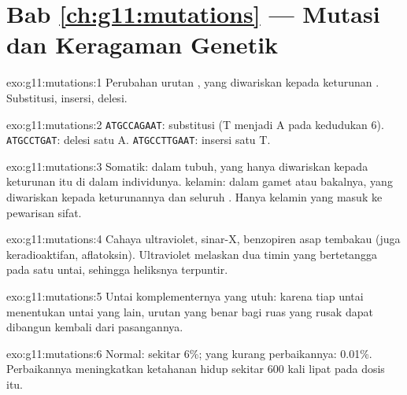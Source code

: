\section*{Bab \ref{ch:g11:mutations} --- Mutasi dan Keragaman Genetik}

\begin{solution}{exo:g11:mutations:1}
Perubahan urutan  , yang diwariskan kepada keturunan
. Substitusi, insersi, delesi.
\end{solution}

\begin{solution}{exo:g11:mutations:2}
\texttt{ATGCCAGAAT}: substitusi (T menjadi A pada kedudukan 6).
\texttt{ATGCCTGAT}: delesi satu A. \texttt{ATGCCTTGAAT}: insersi
satu T.
\end{solution}

\begin{solution}{exo:g11:mutations:3}
Somatik: dalam  tubuh, yang hanya diwariskan kepada keturunan 
itu di dalam individunya.  kelamin: dalam gamet atau bakalnya, yang
diwariskan kepada keturunannya dan seluruh . Hanya  
kelamin yang masuk ke pewarisan sifat.
\end{solution}

\begin{solution}{exo:g11:mutations:4}
Cahaya ultraviolet, sinar-X, benzopiren asap tembakau (juga
keradioaktifan, aflatoksin). Ultraviolet melaskan dua timin yang
bertetangga pada satu untai, sehingga heliksnya terpuntir.
\end{solution}

\begin{solution}{exo:g11:mutations:5}
Untai komplementernya yang utuh: karena tiap untai menentukan untai
yang lain, urutan yang benar bagi ruas yang rusak dapat dibangun
kembali dari pasangannya.
\end{solution}

\begin{solution}{exo:g11:mutations:6}
Normal: sekitar 6\%; yang kurang perbaikannya: 0.01\%. Perbaikannya
meningkatkan ketahanan hidup sekitar 600 kali lipat pada dosis itu.
\end{solution}


